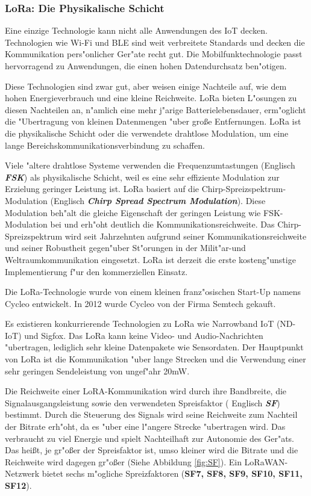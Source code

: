 \subsubsection{LoRa: Die Physikalische Schicht}

Eine einzige Technologie kann nicht alle Anwendungen des IoT 
decken. Technologien wie Wi-Fi und \ac{BLE} sind weit 
verbreitete Standards und decken die Kommunikation pers"onlicher 
Ger"ate recht gut. Die Mobilfunktechnologie passt hervorragend zu 
Anwendungen, die einen hohen Datendurchsatz ben"otigen.

Diese Technologien sind zwar gut, aber weisen einige 
Nachteile auf, wie dem hohen Energieverbrauch und eine kleine
Reichweite. LoRa bieten L"osungen zu 
diesen Nachteilen an, n"amlich eine mehr j"arige Batterielebensdauer, 
erm"oglicht die "Ubertragung von kleinen Datenmengen "uber gro\ss{}e Entfernungen. 
LoRa ist die physikalische Schicht oder die verwendete drahtlose 
Modulation, um eine lange Bereichskommunikationsverbindung zu 
schaffen. 

Viele "altere drahtlose Systeme verwenden die Frequenzumtastungen
(Englisch \textbf{\textit{\ac{FSK}}}) als physikalische Schicht, weil es eine sehr 
effiziente Modulation zur Erzielung geringer Leistung ist. LoRa 
basiert auf die Chirp-Spreizspektrum-Modulation (Englisch 
\textbf{\textit{Chirp Spread Spectrum Modulation}}). Diese Modulation 
beh"alt die gleiche Eigenschaft der geringen Leistung wie 
\ac{FSK}-Modulation bei und erh"oht deutlich die 
Kommunikationsreichweite. Das Chirp-Spreizspektrum wird seit 
Jahrzehnten aufgrund seiner Kommunikationsreichweite und seiner 
Robustheit gegen"uber St"orungen in der Milit"ar-und 
Weltraumkommunikation eingesetzt. LoRa ist derzeit die erste 
kosteng"unstige Implementierung f"ur den kommerziellen Einsatz.


\vspace{1cm}
Die LoRa-Technologie wurde von einem kleinen franz"osischen Start-Up 
namens Cycleo entwickelt. In 2012 wurde Cycleo von der Firma Semtech 
gekauft.

Es existieren konkurrierende Technologien zu LoRa  wie Narrowband IoT 
(ND-IoT) und Sigfox. Das LoRa kann keine Video- und Audio-Nachrichten 
"ubertragen, lediglich sehr kleine Datenpakete wie Sensordaten.
Der Hauptpunkt von LoRa ist die Kommunikation "uber lange 
Strecken und die Verwendung einer sehr geringen Sendeleistung von 
ungef"ahr 20mW. 

Die Reichweite einer LoRA-Kommunikation wird durch ihre Bandbreite, die 
Signalausgangsleistung sowie den verwendeten Spreisfaktor ( Englisch 
\textbf{\textit{\ac{SF}}}) bestimmt. Durch die Steuerung des Signals 
wird seine Reichweite zum Nachteil der Bitrate erh"oht, da es "uber 
eine l"angere Strecke "ubertragen wird. Das verbraucht zu viel 
Energie und spielt Nachteilhaft zur Autonomie des Ger"ats. Das hei\ss{}t, 
je gr"o\ss{}er der Spreisfaktor ist, umso kleiner wird die Bitrate und 
die Reichweite wird dagegen gr"o\ss{}er (Siehe Abbildung \ref{fig:SF}). Ein LoRaWAN-Netzwerk bietet 
sechs m"ogliche Spreizfaktoren (\textbf{SF7, SF8, SF9, SF10, SF11, 
SF12}).  


